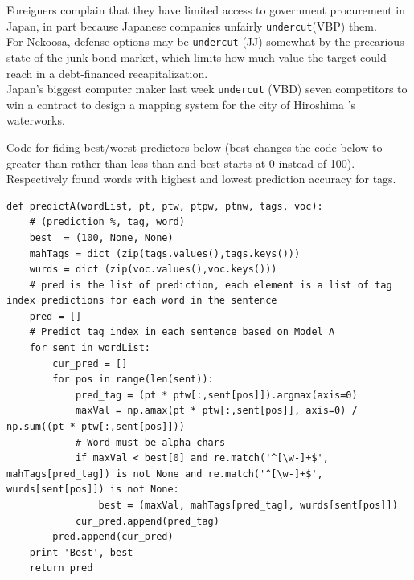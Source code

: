 \documentclass{article}
\begin{document}
\begin{enumerate}
\begin{enumerate}
		Foreigners complain that they have limited access to government procurement in Japan, in part because Japanese companies unfairly \texttt{undercut}(VBP)  them.\\
		For Nekoosa, defense options may be \texttt{undercut} (JJ) somewhat by the precarious state of the junk-bond market, which limits how much value the target could reach in a debt-financed recapitalization.\\
		Japan's biggest computer maker last week \texttt{undercut} (VBD) seven competitors to win a contract  to design a mapping system for the city of Hiroshima 's waterworks.\\
	\end{enumerate}
	
	Code for fiding best/worst predictors below (best changes the code below to greater than rather than less than and best starts at 0 instead of 100). Respectively found words with highest and lowest prediction accuracy for tags.\\

\begin{lstlisting}   
def predictA(wordList, pt, ptw, ptpw, ptnw, tags, voc):
	# (prediction %, tag, word)
	best  = (100, None, None)
	mahTags = dict (zip(tags.values(),tags.keys()))
	wurds = dict (zip(voc.values(),voc.keys()))
	# pred is the list of prediction, each element is a list of tag index predictions for each word in the sentence
	pred = []
	# Predict tag index in each sentence based on Model A
	for sent in wordList:
		cur_pred = []
		for pos in range(len(sent)):
			pred_tag = (pt * ptw[:,sent[pos]]).argmax(axis=0)
			maxVal = np.amax(pt * ptw[:,sent[pos]], axis=0) / np.sum((pt * ptw[:,sent[pos]]))
			# Word must be alpha chars
			if maxVal < best[0] and re.match('^[\w-]+$', mahTags[pred_tag]) is not None and re.match('^[\w-]+$', wurds[sent[pos]]) is not None:
				best = (maxVal, mahTags[pred_tag], wurds[sent[pos]])
			cur_pred.append(pred_tag)
		pred.append(cur_pred)
	print 'Best', best
	return pred
\end{lstlisting}
\end{enumerate}
\end{document}
